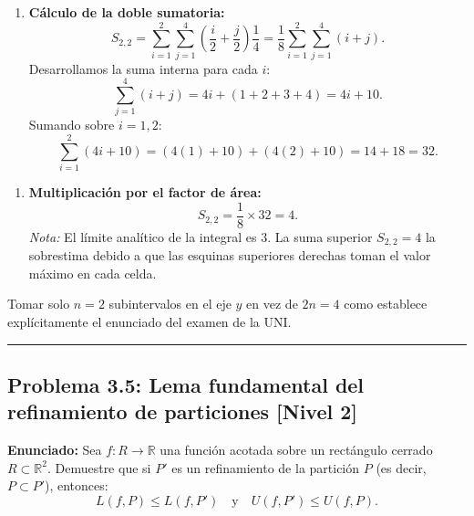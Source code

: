 \documentclass[11pt,a4paper]{article}
\begin{document}
\begin{enumerate}[label=\textbf{\arabic*.}]
\item \textbf{Cálculo de la doble sumatoria:}
\begin{equation*}
S_{2,2} = \sum_{i=1}^2 \sum_{j=1}^4 \left(\frac{i}{2} + \frac{j}{2}\right) \frac{1}{4} = \frac{1}{8} \sum_{i=1}^2 \sum_{j=1}^4 (i + j).
\end{equation*}
Desarrollamos la suma interna para cada $i$:
\begin{equation*}
\sum_{j=1}^4 (i + j) = 4i + (1 + 2 + 3 + 4) = 4i + 10.
\end{equation*}
Sumando sobre $i = 1, 2$:
\begin{equation*}
\sum_{i=1}^2 (4i + 10) = (4(1) + 10) + (4(2) + 10) = 14 + 18 = 32.
\end{equation*}
\end{enumerate}

\begin{enumerate}[label=\textbf{\arabic*.}]
\item \textbf{Multiplicación por el factor de área:}
\begin{equation*}
S_{2,2} = \frac{1}{8} \times 32 = 4.
\end{equation*}
\textit{Nota:} El límite analítico de la integral es $3$. La suma superior $S_{2,2} = 4$ la sobrestima debido a que las esquinas superiores derechas toman el valor máximo en cada celda.
\end{enumerate}

\begin{trapbox}
Tomar solo $n=2$ subintervalos en el eje $y$ en vez de $2n=4$ como establece explícitamente el enunciado del examen de la UNI.
\end{trapbox}

\vspace{0.5cm}
\hrule
\vspace{0.5cm}

\subsection*{Problema 3.5: Lema fundamental del refinamiento de particiones \hfill \color{primaryblue}\small[Nivel 2]}

\begin{tcolorbox}[colback=white,colframe=gray!40,arc=1mm,boxrule=0.5pt,left=3mm,right=3mm,top=2mm,bottom=2mm]
\textbf{Enunciado:} Sea $f: R \to \mathbb{R}$ una función acotada sobre un rectángulo cerrado $R \subset \mathbb{R}^2$. Demuestre que si $P'$ es un refinamiento de la partición $P$ (es decir, $P \subset P'$), entonces:
\begin{equation*}
L(f, P) \le L(f, P') \quad \text{y} \quad U(f, P') \le U(f, P).
\end{equation*}
\end{tcolorbox}
\end{document}
